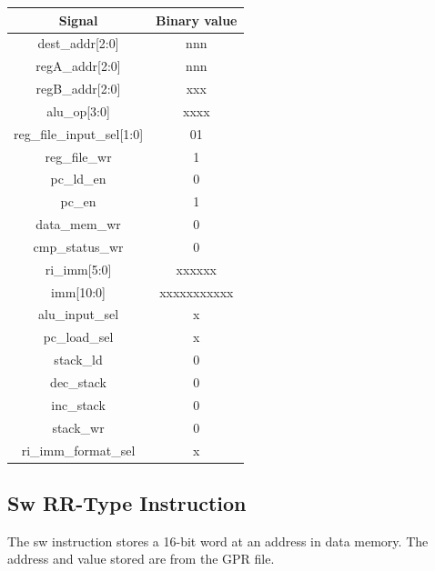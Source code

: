 \documentclass{article}
\begin{document}
\begin{par}
	\begin{center}
		\begin{tabular}{|c|c|}
			\hline 
			\textbf{Signal} & \textbf{Binary value} \\ 
			\hline 
			dest\_addr[2:0] & nnn \\ 
			\hline 
			regA\_addr[2:0] & nnn \\ 
			\hline 
			regB\_addr[2:0] & xxx \\ 
			\hline 
			alu\_op[3:0] & xxxx \\ 
			\hline 
			reg\_file\_input\_sel[1:0] & 01 \\ 
			\hline 
			reg\_file\_wr & 1 \\ 
			\hline 
			pc\_ld\_en & 0 \\ 
			\hline 
			pc\_en & 1 \\ 
			\hline 
			data\_mem\_wr & 0 \\ 
			\hline 
			cmp\_status\_wr & 0 \\ 
			\hline 
			ri\_imm[5:0] & xxxxxx \\ 
			\hline 
			imm[10:0] & xxxxxxxxxxx \\ 
			\hline 
			alu\_input\_sel & x \\ 
			\hline 
			pc\_load\_sel & x \\ 
			\hline 
			stack\_ld & 0 \\ 
			\hline 
			dec\_stack & 0 \\ 
			\hline 
			inc\_stack & 0 \\ 
			\hline 
			stack\_wr & 0 \\ 
			\hline 
			ri\_imm\_format\_sel & x \\ 
			\hline 
		\end{tabular} 
	\end{center}

	\newpage
	\subsection{Sw RR-Type Instruction}
	
	The sw instruction stores a 16-bit word at an address in data memory. The address and value stored are from the GPR file.
	

\end{par}
\end{document}
